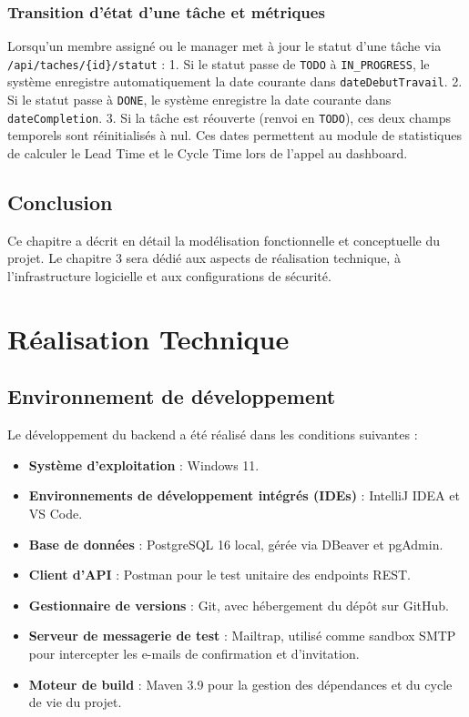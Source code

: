 \documentclass[12pt,a4paper]{report}
\begin{document}
\subsection{Transition d'état d'une tâche et métriques}
Lorsqu'un membre assigné ou le manager met à jour le statut d'une tâche via \verb|/api/taches/{id}/statut| :
1. Si le statut passe de \verb|TODO| à \verb|IN_PROGRESS|, le système enregistre automatiquement la date courante dans \verb|dateDebutTravail|.
2. Si le statut passe à \verb|DONE|, le système enregistre la date courante dans \verb|dateCompletion|.
3. Si la tâche est réouverte (renvoi en \verb|TODO|), ces deux champs temporels sont réinitialisés à nul. Ces dates permettent au module de statistiques de calculer le Lead Time et le Cycle Time lors de l'appel au dashboard.

\section{Conclusion}

Ce chapitre a décrit en détail la modélisation fonctionnelle et conceptuelle du projet. Le chapitre 3 sera dédié aux aspects de réalisation technique, à l'infrastructure logicielle et aux configurations de sécurité.


\chapter{Réalisation Technique}

\section{Environnement de développement}

Le développement du backend a été réalisé dans les conditions suivantes :
\begin{itemize}
\item \textbf{Système d'exploitation} : Windows 11.
\item \textbf{Environnements de développement intégrés (IDEs)} : IntelliJ IDEA et VS Code.
\item \textbf{Base de données} : PostgreSQL 16 local, gérée via DBeaver et pgAdmin.
\item \textbf{Client d'API} : Postman pour le test unitaire des endpoints REST.
\item \textbf{Gestionnaire de versions} : Git, avec hébergement du dépôt sur GitHub.
\item \textbf{Serveur de messagerie de test} : Mailtrap, utilisé comme sandbox SMTP pour intercepter les e-mails de confirmation et d'invitation.
\item \textbf{Moteur de build} : Maven 3.9 pour la gestion des dépendances et du cycle de vie du projet.
\end{itemize}
\end{document}
